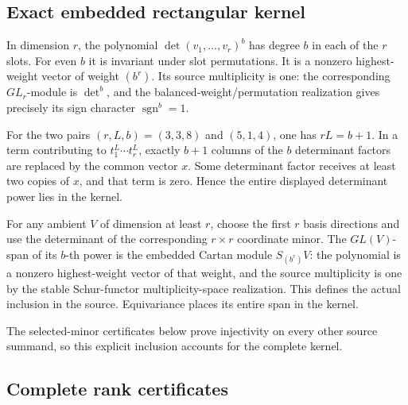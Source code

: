 \documentclass[
  10pt,
]{article}
\begin{document}
\subsection{Exact embedded rectangular
kernel}\label{exact-embedded-rectangular-kernel}

In dimension \(r\), the polynomial \(\det(v_1,\ldots,v_r)^b\) has degree
\(b\) in each of the \(r\) slots. For even \(b\) it is invariant under
slot permutations. It is a nonzero highest-weight vector of weight
\((b^r)\). Its source multiplicity is one: the corresponding
\(GL_r\)-module is \(\det^b\), and the balanced-weight/permutation
realization gives precisely its sign character
\(\operatorname{sgn}^b=1\).

For the two pairs \((r,L,b)=(3,3,8)\) and \((5,1,4)\), one has
\(rL=b+1\). In a term contributing to \(t_1^L\cdots t_r^L\), exactly
\(b+1\) columns of the \(b\) determinant factors are replaced by the
common vector \(x\). Some determinant factor receives at least two
copies of \(x\), and that term is zero. Hence the entire displayed
determinant power lies in the kernel.

For any ambient \(V\) of dimension at least \(r\), choose the first
\(r\) basis directions and use the determinant of the corresponding
\(r\times r\) coordinate minor. The \(GL(V)\)-span of its \(b\)-th power
is the embedded Cartan module \(S_{(b^r)}V\): the polynomial is a
nonzero highest-weight vector of that weight, and the source
multiplicity is one by the stable Schur-functor multiplicity-space
realization. This defines the actual inclusion in the source.
Equivariance places its entire span in the kernel.

The selected-minor certificates below prove injectivity on every other
source summand, so this explicit inclusion accounts for the complete
kernel.

\subsection{Complete rank
certificates}\label{complete-rank-certificates}
\end{document}
